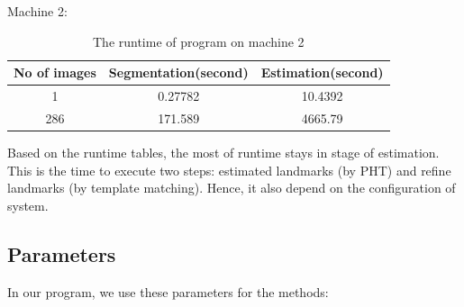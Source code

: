 Machine 2:
\begin{table}[h]
	\centering
	\begin{tabular}{|c|c|c|}
		\hline
		No of images & Segmentation(second) & Estimation(second) \\ \hline
		1 & 0.27782 & 10.4392   \\ \hline
		286 & 171.589 & 4665.79   \\ \hline
	\end{tabular}
	\caption{The runtime of program on machine 2}
	\label{table_runtime2}
\end{table}
Based on the runtime tables, the most of runtime stays in stage of estimation. This is the time to execute two steps: estimated landmarks (by PHT) and refine landmarks (by template matching). Hence, it also depend on the configuration of system.
\subsection{Parameters}
In our program, we use these parameters for the methods:

